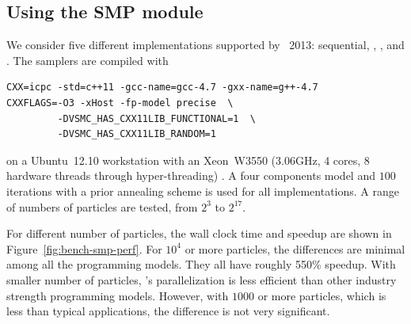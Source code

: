 \subsection{Using the SMP module}
\label{sub:Using the SMP module}

We consider five different implementations supported by \icpc~2013:
sequential, \tbb, \cilk, \openmp and \cppoo{} . The samplers
are compiled with
\begin{verbatim}
CXX=icpc -std=c++11 -gcc-name=gcc-4.7 -gxx-name=g++-4.7
CXXFLAGS=-O3 -xHost -fp-model precise  \
         -DVSMC_HAS_CXX11LIB_FUNCTIONAL=1  \
         -DVSMC_HAS_CXX11LIB_RANDOM=1
\end{verbatim}
on a Ubuntu~12.10 workstation with an Xeon~W3550 (3.06GHz, 4 cores, 8 hardware
threads through hyper-threading) \cpu. A four components model and $100$
iterations with a prior annealing scheme is used for all implementations. A
range of numbers of particles are tested, from $2^3$ to $2^{17}$.

For different number of particles, the wall clock time and speedup are shown
in Figure~\ref{fig:bench-smp-perf}. For $10^4$ or more particles, the
differences are minimal among all the programming models. They all have
roughly 550\% speedup. With smaller number of particles, \vsmc's \cppoo
parallelization is less efficient than other industry strength programming
models. However, with $1000$ or more particles, which is less than typical
applications, the difference is not very significant.

